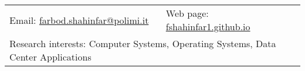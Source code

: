 { %
\noindent
\begin{tabular}{p{8cm}l}
    Email: \href{mailto:farbod.shahinfar@polimi.it}{farbod.shahinfar@polimi.it} & 
    Web page: \href{https://fshahinfar1.github.io}{fshahinfar1.github.io} \\
    \multicolumn{2}{l}{Research interests: Computer Systems, Operating Systems, Data Center Applications}
\end{tabular}
}
